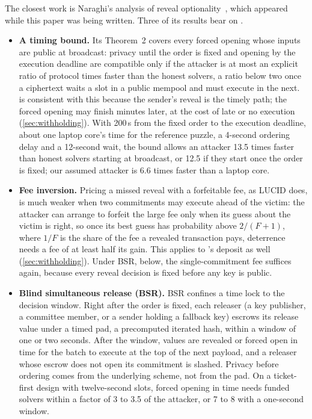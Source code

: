 The closest work is Naraghi's analysis of reveal optionality~\cite{Naraghi26}, which appeared while this paper was being written. Three of its results bear on \leanseal.
\begin{itemize}[leftmargin=1.5em]
  \item \textbf{A timing bound.} Its Theorem~2 covers every forced opening whose inputs are public at broadcast: privacy until the order is fixed and opening by the execution deadline are compatible only if the attacker is at most an explicit ratio of protocol times faster than the honest solvers, a ratio below two once a ciphertext waits a slot in a public mempool and must execute in the next. \leanseal is consistent with this because the sender's reveal is the timely path; the forced opening may finish minutes later, at the cost of late or no execution (\cref{sec:withholding}). With 200\,s from the fixed order to the execution deadline, about one laptop core's time for the reference puzzle, a 4-second ordering delay and a 12-second wait, the bound allows an attacker 13.5 times faster than honest solvers starting at broadcast, or 12.5 if they start once the order is fixed; our assumed attacker is 6.6 times faster than a laptop core.
  \item \textbf{Fee inversion.} Pricing a missed reveal with a forfeitable fee, as LUCID does, is much weaker when two commitments may execute ahead of the victim: the attacker can arrange to forfeit the large fee only when its guess about the victim is right, so once its best guess has probability above $2/(F+1)$, where $1/F$ is the share of the fee a revealed transaction pays, deterrence needs a fee of at least half its gain. This applies to \leanseal's deposit as well (\cref{sec:withholding}). Under BSR, below, the single-commitment fee suffices again, because every reveal decision is fixed before any key is public.
  \item \textbf{Blind simultaneous release (BSR).} BSR confines a time lock to the decision window. Right after the order is fixed, each releaser (a key publisher, a committee member, or a sender holding a fallback key) escrows its release value under a timed pad, a precomputed iterated hash, within a window of one or two seconds. After the window, values are revealed or forced open in time for the batch to execute at the top of the next payload, and a releaser whose escrow does not open its commitment is slashed. Privacy before ordering comes from the underlying scheme, not from the pad. On a ticket-first design with twelve-second slots, forced opening in time needs funded solvers within a factor of 3 to 3.5 of the attacker, or 7 to 8 with a one-second window.
\end{itemize}
